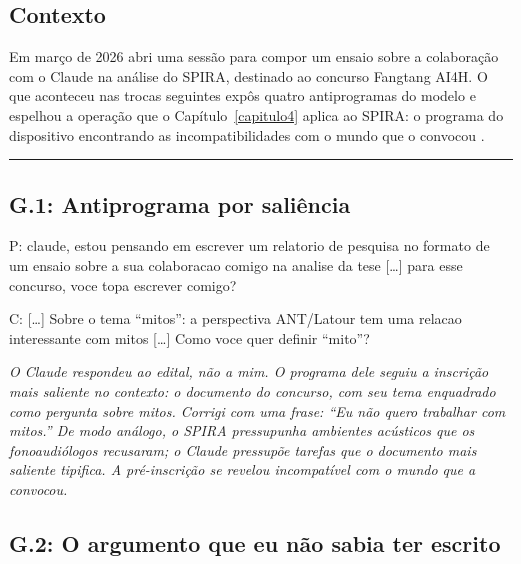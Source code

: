 \subsection*{Contexto}

Em março de 2026 abri uma sessão para compor um ensaio sobre a colaboração com o Claude na análise do SPIRA, destinado ao concurso Fangtang AI4H. O que aconteceu nas trocas seguintes expôs quatro antiprogramas do modelo e espelhou a operação que o Capítulo~\ref{capitulo4} aplica ao SPIRA: o programa do dispositivo encontrando as incompatibilidades com o mundo que o convocou \parencite{Akrich1992Description}.

\bigskip
\noindent\rule{\textwidth}{0.4pt}
\bigskip

\subsection*{G.1: Antiprograma por saliência}

\begin{faladaP}
P: claude, estou pensando em escrever um relatorio de pesquisa no formato de um ensaio sobre a sua colaboracao comigo na analise da tese [\ldots] para esse concurso, voce topa escrever comigo?
\end{faladaP}

\begin{faladaC}
C: [\ldots] Sobre o tema ``mitos'': a perspectiva ANT/Latour tem uma relacao interessante com mitos [\ldots] Como voce quer definir ``mito''?
\end{faladaC}

\noindent\emph{O Claude respondeu ao edital, não a mim. O programa dele seguiu a inscrição mais saliente no contexto: o documento do concurso, com seu tema enquadrado como pergunta sobre mitos. Corrigi com uma frase: ``Eu não quero trabalhar com mitos.'' De modo análogo, o SPIRA pressupunha ambientes acústicos que os fonoaudiólogos recusaram; o Claude pressupõe tarefas que o documento mais saliente tipifica. A pré-inscrição se revelou incompatível com o mundo que a convocou.}

\par{}

\subsection*{G.2: O argumento que eu não sabia ter escrito}

\par\smallskip

